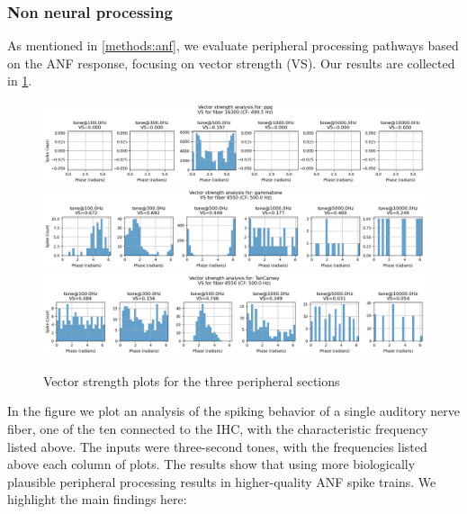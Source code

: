 \documentclass[11pt,a4paper]{article}
\begin{document}
\subsubsection{Non neural processing}
As mentioned in \ref{methods:anf}, we evaluate peripheral processing pathways based on the ANF response, focusing on vector strength (VS). Our results are collected in \ref{fig:vectorstrength}. 
\begin{figure}[H]
    \centering
    \includegraphics[width=1\linewidth]{Images/VSppg.png}
    \includegraphics[width=1\linewidth]{Images/VSgamm.png}
    \includegraphics[width=1\linewidth]{Images/VStancarney.png}
    \caption{Vector strength plots for the three peripheral sections}
    \label{fig:vectorstrength}
\end{figure}
In the figure we plot an analysis of the spiking behavior of a single auditory nerve fiber, one of the ten connected to the IHC, with the characteristic frequency listed above. The inputs were three-second tones, with the frequencies listed above each column of plots. The results show that using more biologically plausible peripheral processing results in higher-quality ANF spike trains. We highlight the main findings here:
\end{document}
